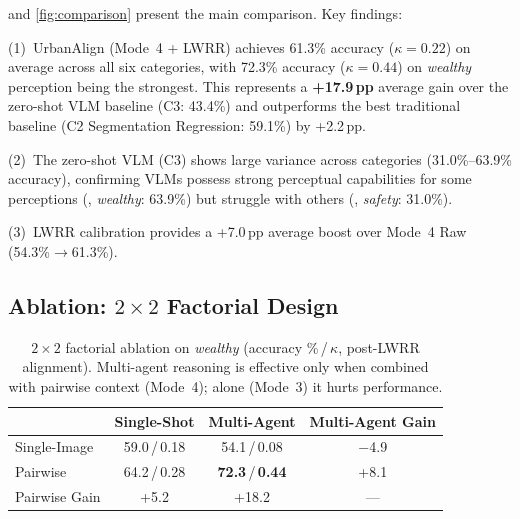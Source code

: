 \documentclass[runningheads]{llncs}
\begin{document}
 and \cref{fig:comparison} present the main comparison.
Key findings:

(1)~UrbanAlign (Mode~4 + LWRR) achieves 61.3\% accuracy ($\kappa{=}0.22$) on average across all six categories, with 72.3\% accuracy ($\kappa{=}0.44$) on \emph{wealthy} perception being the strongest.
This represents a \textbf{+17.9\,pp} average gain over the zero-shot VLM baseline (C3: 43.4\%) and outperforms the best traditional baseline (C2 Segmentation Regression: 59.1\%) by +2.2\,pp.

(2)~The zero-shot VLM (C3) shows large variance across categories (31.0\%--63.9\% accuracy), confirming VLMs possess strong perceptual capabilities for some perceptions (\eg, \emph{wealthy}: 63.9\%) but struggle with others (\eg, \emph{safety}: 31.0\%).

(3)~LWRR calibration provides a +7.0\,pp average boost over Mode~4 Raw (54.3\%$\to$61.3\%).

\subsection{Ablation: $2{\times}2$ Factorial Design}

\begin{table}[t]
\centering
\caption{$2{\times}2$ factorial ablation on \emph{wealthy} (accuracy \%\,/\,$\kappa$, post-LWRR alignment). Multi-agent reasoning is effective only when combined with pairwise context (Mode~4); alone (Mode~3) it hurts performance.}
\label{tab:factorial}
\small
\begin{tabular}{l|cc|c}
\toprule
 & Single-Shot & Multi-Agent & Multi-Agent Gain \\
\midrule
Single-Image & 59.0\,/\,0.18 & 54.1\,/\,0.08 & $-$4.9 \\
Pairwise     & 64.2\,/\,0.28 & \textbf{72.3}\,/\,\textbf{0.44} & +8.1 \\
\midrule
Pairwise Gain & +5.2 & +18.2 & --- \\
\bottomrule
\end{tabular}
\end{table}
\end{document}
